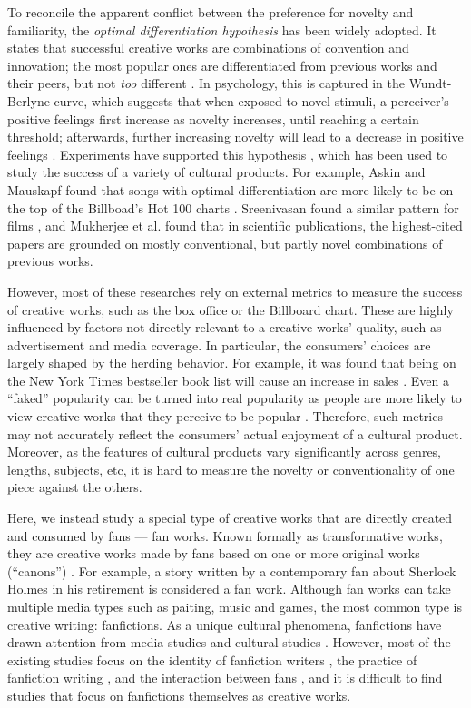 \documentclass[a4paper]{article}
\begin{document}
To reconcile the apparent conflict between the preference for novelty and familiarity, the \emph{optimal differentiation hypothesis} \cite{thompson2017hit} has been widely adopted. It states that successful creative works are combinations of convention and innovation; the most popular ones are differentiated from previous works and their peers, but not \emph{too} different . In psychology, this is captured in the Wundt-Berlyne curve, which suggests that when exposed to novel stimuli, a perceiver's positive feelings first increase as novelty increases, until reaching a certain threshold; afterwards, further increasing novelty will lead to a decrease in positive feelings \cite{berlyne1970novelty}. Experiments have supported this hypothesis \cite{hargreaves1984effects} \cite{sluckin1980liking}, which has been used to study the success of a variety of cultural products. For example, Askin and Mauskapf found that songs with optimal differentiation are more likely to be on the top of the Billboad's Hot 100 charts \cite{askin2017makes}. Sreenivasan found a similar pattern for films \cite{sreenivasan2013quantitative}, and Mukherjee et al. found that in scientific publications, the highest-cited papers are grounded on mostly conventional, but partly novel combinations of previous works. 

However, most of these researches rely on external metrics to measure the success of creative works, such as the box office or  the Billboard chart. These are highly influenced by factors not directly relevant to a creative works' quality, such as advertisement and media coverage. In particular, the consumers' choices are largely shaped by the herding behavior. For example, it was found that being on the New York Times bestseller book list will cause an increase in sales \cite{sorensen2007bestseller}.  Even a ``faked'' popularity can be turned into real popularity as people are more likely to view creative works that they perceive to be popular \cite{salganik2008leading}. Therefore, such metrics may not accurately reflect the consumers' actual enjoyment of a cultural product. Moreover, as the features of cultural products vary significantly across genres, lengths, subjects, etc, it is hard to measure the novelty or conventionality of one piece against the others. 

Here, we instead study a special type of creative works that are directly created and consumed by fans --- fan works. Known formally as transformative works, they are creative works made by fans based on one or more original works (``canons'') \cite{wiki:transf_work}. For example, a story written by a contemporary fan about Sherlock Holmes in his retirement is considered a fan work. Although fan works can take multiple media types such as paiting, music and games, the most common type is creative writing: fanfictions. As a unique cultural phenomena, fanfictions have drawn attention from media studies and cultural studies \cite{thomas2011fanfiction}. However, most of the existing studies focus on the identity of fanfiction writers \cite{black2006language}, the practice of fanfiction writing \cite{LIT:LIT12061}, and the interaction between fans \cite{hills2015expertise}, and it is difficult to find studies that focus on fanfictions themselves as creative works.
\end{document}
